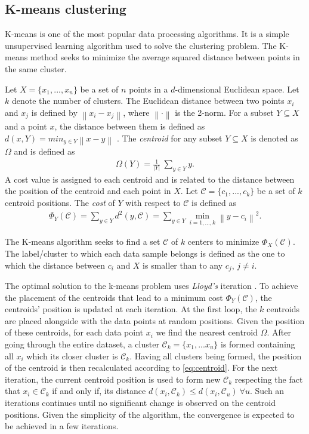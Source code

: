 \documentclass[letterpaper, 10 pt, conference]{ieeeconf}
\begin{document}
\subsection{K-means clustering} \label{sec:Kmeans}
K-means is one of the most popular data processing algorithms. It is a simple unsupervised learning algorithm used to solve the clustering problem.
The K-means method seeks to minimize the average squared distance between points in the same cluster\cite{arthur2007k}.

Let $X = \{x_1,...,x_n\}$ be a set of $n$ points in a $d$-dimensional Euclidean space. Let $k$ denote the number of clusters. The Euclidean distance between two points $x_i$ and $x_j$ is defined by $\left \| x_i-x_j \right \|$, where $\left \| \cdot \right \|$ is the 2-norm. For a subset $Y \subseteq X $ and a point $x$, the distance between them is defined as $d(x,Y) = {min}_{y\in Y}\left \| x-y \right \|$   \cite{bahmani2012scalable}. The \textit{centroid} for any subset $Y \subseteq X $ is denoted as $\Omega$ and is defined as
\begin{align}\label{eq:centroid}
\Omega(Y) = \frac{1}{\left | Y \right |}~\sum_{y\in Y} y.
\end{align}
A cost value is assigned to each centroid and is related to the distance between the position of the centroid and each point in $X$. Let $\mathcal{C} = \{c_1,...,c_k\}$ be a set of $k$ centroid positions.  The \textit{cost} of $Y$ with respect to $\mathcal{C}$ is defined as
\begin{align}\label{eq:cost_k-mens}
\Phi_Y(\mathcal{C}) = \sum_{y\in Y} d^2(y,\mathcal{C}) = \sum_{y\in Y} \min_{i=1,...,k} \left \|y-c_i  \right \|^2.
\end{align}

The K-means algorithm seeks to find a set $\mathcal{C}$ of $k$ centers to minimize $\Phi_X(\mathcal{C})$. The label/cluster to which each data sample belongs is defined as the one to which the distance between $c_i$ and $X$ is smaller than to any $c_j$, $j\neq i$.

The optimal solution to the k-means problem uses \textit{Lloyd's} iteration \cite{ostrovsky2006effectiveness}. To achieve the placement of the centroids that lead to a minimum cost $\Phi_Y(\mathcal{C})$, the centroids' position is updated at each iteration. At the first loop, the $k$ centroids are placed alongside with the data points at random positions. Given the position of these centroids, for each data point $x_i$ we find the nearest centroid $\Omega$. After going through the entire dataset, a cluster $\mathcal{C}_k = \{x_1,...x_u\}$ is formed containing all $x_i$ which its closer cluster is $\mathcal{C}_k$. Having all clusters being formed, the position of the centroid is then recalculated according to \eqref{eq:centroid}. For the next iteration, the current centroid position is used to form new $\mathcal{C}_k$ respecting the fact that $x_i \in \mathcal{C}_k$ if and only if, its distance $d(x_i,\mathcal{C}_k) \leq d(x_i,\mathcal{C}_u) ~ \forall u$. Such an iterations continues until no significant change is observed on the centroid positions. Given the simplicity of the algorithm, the convergence is expected to be achieved in a few iterations.
\end{document}
